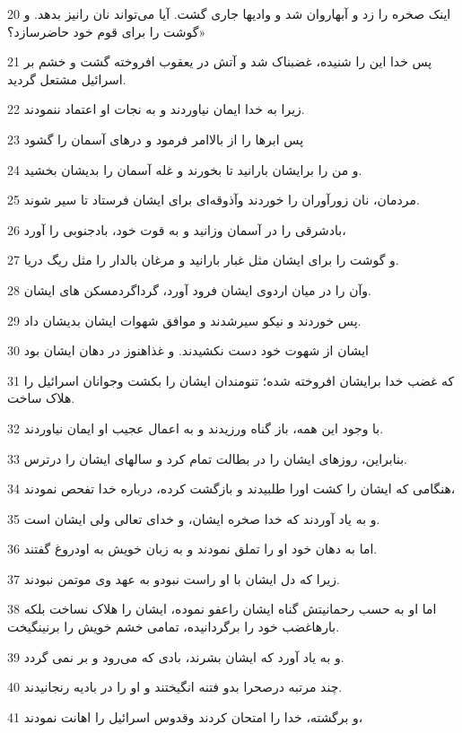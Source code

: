 \par 20 اینک صخره را زد و آبهاروان شد و وادیها جاری گشت. آیا می‌تواند نان رانیز بدهد. و گوشت را برای قوم خود حاضرسازد؟»
\par 21 پس خدا این را شنیده، غضبناک شد و آتش در یعقوب افروخته گشت و خشم بر اسرائیل مشتعل گردید.
\par 22 زیرا به خدا ایمان نیاوردند و به نجات او اعتماد ننمودند.
\par 23 پس ابرها را از بالاامر فرمود و درهای آسمان را گشود
\par 24 و من را برایشان بارانید تا بخورند و غله آسمان را بدیشان بخشید.
\par 25 مردمان، نان زورآوران را خوردند وآذوقه‌ای برای ایشان فرستاد تا سیر شوند.
\par 26 بادشرقی را در آسمان وزانید و به قوت خود، بادجنوبی را آورد،
\par 27 و گوشت را برای ایشان مثل غبار بارانید و مرغان بالدار را مثل ریگ دریا.
\par 28 وآن را در میان اردوی ایشان فرود آورد، گرداگردمسکن های ایشان.
\par 29 پس خوردند و نیکو سیرشدند و موافق شهوات ایشان بدیشان داد.
\par 30 ایشان از شهوت خود دست نکشیدند. و غذاهنوز در دهان ایشان بود
\par 31 که غضب خدا برایشان افروخته شده؛ تنومندان ایشان را بکشت وجوانان اسرائیل را هلاک ساخت.
\par 32 با وجود این همه، باز گناه ورزیدند و به اعمال عجیب او ایمان نیاوردند.
\par 33 بنابراین، روزهای ایشان را در بطالت تمام کرد و سالهای ایشان را درترس.
\par 34 هنگامی که ایشان را کشت اورا طلبیدند و بازگشت کرده، درباره خدا تفحص نمودند،
\par 35 و به یاد آوردند که خدا صخره ایشان، و خدای تعالی ولی ایشان است.
\par 36 اما به دهان خود او را تملق نمودند و به زبان خویش به اودروغ گفتند.
\par 37 زیرا که دل ایشان با او راست نبودو به عهد وی موتمن نبودند.
\par 38 اما او به حسب رحمانیتش گناه ایشان راعفو نموده، ایشان را هلاک نساخت بلکه بارهاغضب خود را برگردانیده، تمامی خشم خویش را برنینگیخت.
\par 39 و به یاد آورد که ایشان بشرند، بادی که می‌رود و بر نمی گردد.
\par 40 چند مرتبه درصحرا بدو فتنه انگیختند و او را در بادیه رنجانیدند.
\par 41 و برگشته، خدا را امتحان کردند وقدوس اسرائیل را اهانت نمودند،
